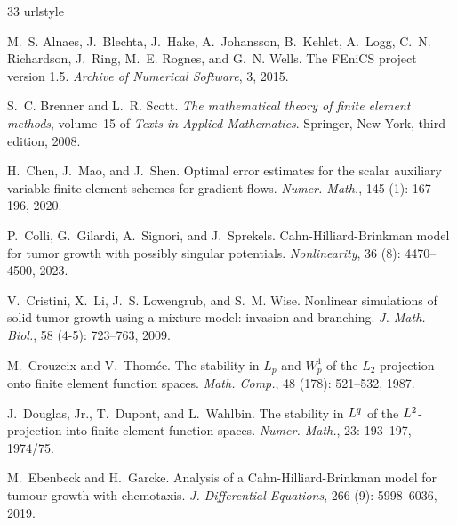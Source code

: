 \documentclass[11pt, reqno]{amsart}
\theoremstyle{definition}
\numberwithin{equation}{section}
\begin{document}
\begin{thebibliography}{33}
	\providecommand{\natexlab}[1]{#1}
	\providecommand{\url}[1]{\texttt{#1}}
	\expandafter\ifx\csname urlstyle\endcsname\relax
	\providecommand{\doi}[1]{doi: #1}\else
	\providecommand{\doi}{doi: \begingroup \urlstyle{rm}\Url}\fi
	
	M.~S. Alnaes, J.~Blechta, J.~Hake, A.~Johansson, B.~Kehlet, A.~Logg, C.~N.
	Richardson, J.~Ring, M.~E. Rognes, and G.~N. Wells.
	\newblock The {FEniCS} project version 1.5.
	\newblock \emph{Archive of Numerical Software}, 3, 2015.
	
	S.~C. Brenner and L.~R. Scott.
	\newblock \emph{The mathematical theory of finite element methods}, volume~15
	of \emph{Texts in Applied Mathematics}.
	\newblock Springer, New York, third edition, 2008.
	
	H.~Chen, J.~Mao, and J.~Shen.
	\newblock Optimal error estimates for the scalar auxiliary variable
	finite-element schemes for gradient flows.
	\newblock \emph{Numer. Math.}, 145 (1): 167--196, 2020.
	
	P.~Colli, G.~Gilardi, A.~Signori, and J.~Sprekels.
	\newblock Cahn-{H}illiard-{B}rinkman model for tumor growth with possibly
	singular potentials.
	\newblock \emph{Nonlinearity}, 36 (8): 4470--4500, 2023.
	
	V.~Cristini, X.~Li, J.~S. Lowengrub, and S.~M. Wise.
	\newblock Nonlinear simulations of solid tumor growth using a mixture model:
	invasion and branching.
	\newblock \emph{J. Math. Biol.}, 58 (4-5): 723--763, 2009.
	
	M.~Crouzeix and V.~Thom\'{e}e.
	\newblock The stability in {$L_p$} and {$W^1_p$} of the {$L_2$}-projection onto
	finite element function spaces.
	\newblock \emph{Math. Comp.}, 48 (178): 521--532, 1987.
	
	J.~Douglas, Jr., T.~Dupont, and L.~Wahlbin.
	\newblock The stability in {$L\sp{q}$} of the {$L\sp{2}$}-projection into
	finite element function spaces.
	\newblock \emph{Numer. Math.}, 23: 193--197, 1974/75.
	
	M.~Ebenbeck and H.~Garcke.
	\newblock Analysis of a {C}ahn-{H}illiard-{B}rinkman model for tumour growth
	with chemotaxis.
	\newblock \emph{J. Differential Equations}, 266 (9):
	5998--6036, 2019.
	

\end{thebibliography}
\end{document}
